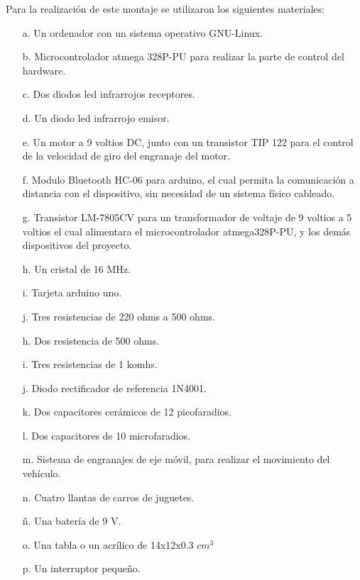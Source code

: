 \documentclass[12]{article}
\begin{document}
\begin{multicols}{2}
Para la realización de este montaje se utilizaron los siguientes materiales:
\begin{enumerate}
\item[a.] Un ordenador con un sistema operativo GNU-Linux.
\item[b.] Microcontrolador atmega 328P-PU \cite{ARDUINO} para realizar la parte de control del hardware.
\item[c.] Dos diodos led infrarrojos\cite{INFRARED} receptores.
\item[d.] Un diodo led infrarrojo\cite{INFRARED} emisor.
\item[e.] Un motor a 9 voltios DC, junto con un transistor TIP 122\cite{TIP122}   para el control de la velocidad de giro del engranaje del motor.
\item[f.] Modulo Bluetooth HC-06 para arduino, el cual permita la comunicación a distancia con el dispositivo, sin necesidad de un sistema físico cableado.
\item[g.] Transistor LM-7805CV \cite{REGULADOR} para un transformador de voltaje de 9 voltios a 5 voltios el cual alimentara el microcontrolador atmega328P-PU, y los demás dispositivos del proyecto.
\item[h.] Un cristal de 16 MHz.
\item[i.] Tarjeta arduino \cite{ARDUINO} uno.
\item[j.] Tres resistencias de 220 ohms a 500 ohms.
\item[h.] Dos resistencia de 500 ohms.
\item[i.] Tres resistencias de 1 komhs.
\item[j.] Diodo rectificador de referencia 1N4001. \cite{DIODO}
\item[k.] Dos capacitores cerámicos de 12 picofaradios.
\item[l.] Dos capacitores de 10 microfaradios.
\item[m.] Sistema de engranajes de eje móvil, para realizar el movimiento del vehículo.
\item[n.] Cuatro llantas de carros de juguetes.
\item[ñ.] Una batería de 9 V.
\item[o.] Una tabla o un acrílico de 14x12x0.3 $cm^{3}$
\item[p.] Un interruptor pequeño.
\end{enumerate}


\end{multicols}
\end{document}
